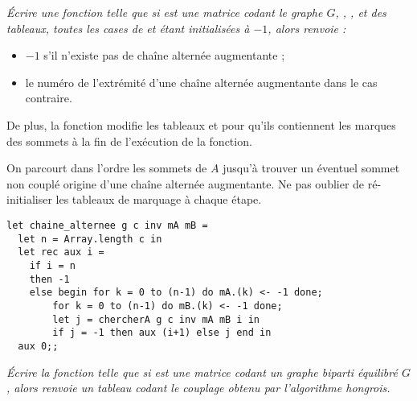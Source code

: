 \newpage
\begin{Exercise}\it
Écrire une fonction  telle que si  est une matrice codant le graphe $G$, , ,  et  des tableaux, toutes les cases de  et  étant initialisées à $-1$, alors  renvoie :
\begin{itemize}
  \item $-1$ s'il n'existe pas de chaîne alternée augmentante ;
  \item le numéro de l'extrémité d'une chaîne alternée augmentante dans le cas contraire.
\end{itemize}
De plus, la fonction modifie les tableaux  et  pour qu'ils contiennent les marques des sommets à la fin de l'exécution de la fonction.
\end{Exercise}
\begin{Answer}
On parcourt dans l'ordre les sommets de $A$ jusqu'à trouver un éventuel sommet non couplé origine d'une chaîne
alternée augmentante. Ne pas oublier de ré-initialiser les tableaux de marquage à chaque étape.

\begin{lstlisting}
let chaine_alternee g c inv mA mB =
  let n = Array.length c in
  let rec aux i =
    if i = n
    then -1
    else begin for k = 0 to (n-1) do mA.(k) <- -1 done;
        for k = 0 to (n-1) do mB.(k) <- -1 done;
        let j = chercherA g c inv mA mB i in
        if j = -1 then aux (i+1) else j end in
  aux 0;;
\end{lstlisting}
\end{Answer}
\begin{Exercise}\it
Écrire  la fonction  telle que si  est une matrice codant un graphe biparti équilibré $G$, alors  renvoie un tableau codant le couplage obtenu par l'algorithme hongrois.
\end{Exercise}
